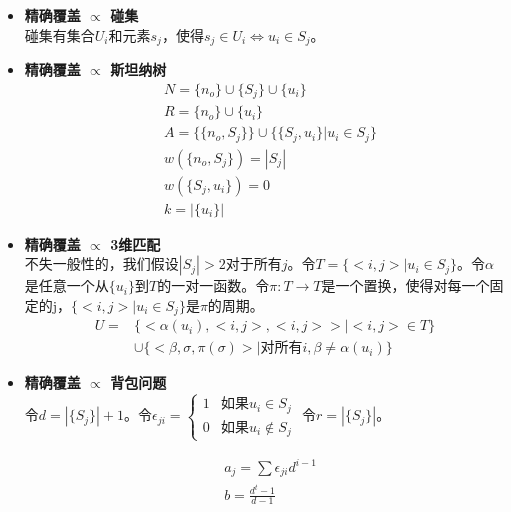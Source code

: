 \documentclass[twocolumn]{article}
\theoremstyle{nonumberplain}%
\begin{document}
\begin{itemize}
    \item {\bf 精确覆盖 $\propto$ 碰集}\\
        碰集有集合$U_i$和元素$s_j$，使得$s_j\in U_i\Leftrightarrow u_i\in S_j$。

    \item {\bf 精确覆盖 $\propto$ 斯坦纳树}
        \begin{equation}\nonumber %
        \begin{aligned}
        &N=\{n_o\}\cup\{S_j\}\cup\{u_i\}\\
        &R=\{n_o\}\cup\{u_i\}\\
        &A=\{\{n_o,S_j\}\}\cup\{\{S_j,u_i\}|u_i\in S_j\}\\
        &w(\{n_o,S_j\})=|S_j|\\
        &w(\{S_j,u_i\})=0\\
        &k=|\{u_i\}|
        \end{aligned}
        \end{equation}

    \item {\bf 精确覆盖 $\propto$ 3维匹配}\\
        不失一般性的，我们假设$|S_j|>2$对于所有$j$。令$T=\{<i,j>|u_i\in S_j\}$。令$\alpha$是任意一个从$\{u_i\}$到$T$的一对一函数。令$\pi:T\rightarrow T$是一个置换，使得对每一个固定的j，$\{<i,j>|u_i\in S_j\}$是$\pi$的周期。
        \begin{equation}\nonumber %
        \begin{aligned}
        U=&\{<\alpha(u_i),<i,j>,<i,j>>|<i,j>\in T\}\\
          &\cup\{<\beta,\sigma,\pi(\sigma)>|\text{对所有}i,\beta\neq \alpha(u_i)\}
        \end{aligned}
        \end{equation}

    \item {\bf 精确覆盖 $\propto$ 背包问题}\\
        令$d=|\{S_j\}|+1$。令$\epsilon_{ji}=
        \left\{\begin{matrix}
            1 & \text{如果}u_i\in S_j \\
            0 & \text{如果}u_i\notin S_j
        \end{matrix}\right.$ 令$r=|\{S_j\}|$。

        \begin{equation}\nonumber %
        \begin{aligned}
        &a_j=\sum\epsilon_{ji}d^{i-1}\\
        &b=\frac{d^t-1}{d-1}
        \end{aligned}
        \end{equation}


\end{itemize}
\end{document}
